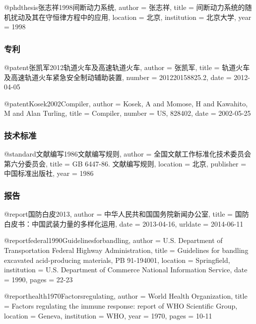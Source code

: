 \begin{latexexample}
  @phdthesis{张志祥1998间断动力系统,
    author       = {张志祥},
    title        = {间断动力系统的随机扰动及其在守恒律方程中的应用},
    location     = {北京},
    institution  = {北京大学},
    year         = {1998}
  }
\end{latexexample}


\subsubsection{专利}

\begin{latexexample}

  @patent{张凯军2012轨道火车及高速轨道火车,
    author       = {张凯军},
    title        = {轨道火车及高速轨道火车紧急安全制动辅助装置},
    number       = {201220158825.2},     
    date         = {2012-04-05}
  }

  @patent{Kosek2002Compiler,
    author       = {Kosek, A and Momose, H and Kawahito, M and Alan Turling},
    title        = {Compiler},
    number       = {US, 828402},     
    date         = {2002-05-25}
  }
\end{latexexample}


\subsubsection{技术标准}

\begin{latexexample}
  @standard{文献编写1986文献编写规则,
    author       = {全国文献工作标准化技术委员会第六分委员会},
    title        = {GB 6447-86. 文献编写规则},
    location     = {北京},
    publisher    = {中国标准出版社},
    year         = {1986}
  }
\end{latexexample}


\subsubsection{报告}

\begin{latexexample}
  @report{国防白皮2013,
    author       = {中华人民共和国国务院新闻办公室},
    title        = {国防白皮书：中国武装力量的多样化运用},
    date         = {2013-04-16},
    urldate      = {2014-06-11}
  }

  @report{federal1990Guidelinesforbandling,
    author       = {{U.S. Department of Transportation Federal Highway Administration}},
    title        = {Guidelines for bandling excavated acid-producing materials, PB 91-194001},
    location     = {Springfield},
    institution  = {U.S. Department of Commerce National Information Service},
    date         = {1990},
    pages        = {22-23} 
  }

  @report{health1970Factorsregulating,
    author       = {{World Health Organization}},
    title        = {Factors regulating the immune response: report of WHO Scientific Group},
    location     = {Geneva},
    institution  = {WHO},
    year         = {1970},
    pages        = {10-11} 
  }
\end{latexexample}


